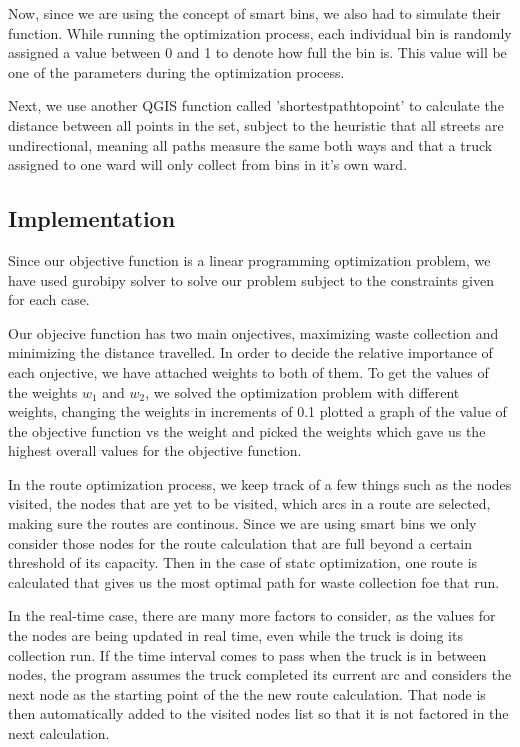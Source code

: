 \documentclass[12pt]{article}
\begin{document}
Now, since we are using the concept of smart bins, we also had to simulate their function. While running the optimization process, each individual bin is randomly assigned a value between 0 and 1 to denote how full the bin is. This value will be one of the parameters during the optimization process.

Next, we use another QGIS function called 'shortestpathtopoint' to calculate the distance between all points in the set, subject to the heuristic that all streets are undirectional, meaning all paths measure the same both ways and that a truck assigned to one ward will only collect from bins in it's own ward.

\subsection{Implementation}

Since our objective function is a linear programming optimization problem, we have used gurobipy solver to solve our problem subject to the constraints given for each case.

Our objecive function has two main onjectives, maximizing waste collection and minimizing the distance travelled. In order to decide the relative importance of each onjective, we have attached weights to both of them. To get the values of the weights $w_1$ and $w_2$, we solved the optimization problem with different weights, changing the weights in increments of 0.1 plotted a graph of the value of the objective function vs the weight and picked the weights which gave us the highest overall values for the objective function.       

In the route optimization process, we keep track of a few things such as the nodes visited, the nodes that are yet to be visited, which arcs in a route are selected, making sure the routes are continous. Since we are using smart bins we only consider those nodes for the route calculation that are full beyond a certain threshold of its capacity. Then in the case of statc optimization, one route is calculated that gives us the most optimal path for waste collection foe that run.

In the real-time case, there are many more factors to consider, as the values for the nodes are being updated in real time, even while the truck is doing its collection run. If the time interval comes to pass when the truck is in between nodes, the program assumes the truck completed its current arc and considers the next node as the starting point of the the new route calculation. That node is then automatically added to the visited nodes list so that it is not factored in the next calculation.
\end{document}
